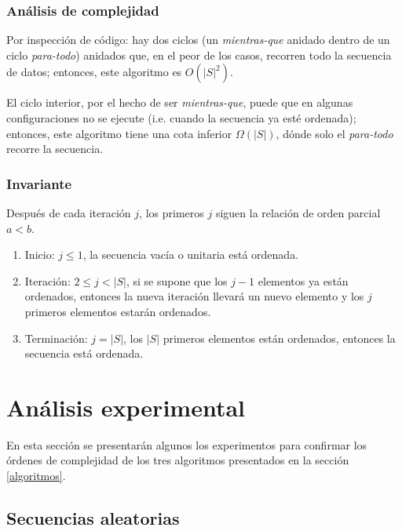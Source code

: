\documentclass[letter]{article}
\begin{document}
\subsubsection{Análisis de complejidad} \label{algoritmos:insercion:complejidad}

Por inspección de código: hay dos ciclos (un {\it mientras-que} anidado dentro de un ciclo {\it para-todo}) anidados que, en el peor de los casos, recorren todo la secuencia de datos; entonces, este algoritmo es $O(|S|^2)$.

El ciclo interior, por el hecho de ser {\it mientras-que}, puede que en algunas configuraciones no se ejecute (i.e. cuando la secuencia ya esté ordenada); entonces, este algoritmo tiene una cota inferior $\Omega(|S|)$, dónde solo el {\it para-todo} recorre la secuencia.

\subsubsection{Invariante} \label{algoritmos:insercion:invariante}

Después de cada iteración $j$, los primeros $j$ siguen la relación de orden parcial $a<b$.

\begin{enumerate}
    \item Inicio: $j \le 1$, la secuencia vacía o unitaria está ordenada.
    \item Iteración: $2 \le j < |S|$, si se supone que los $j-1$ elementos ya están ordenados, entonces la nueva iteración llevará un nuevo elemento y los $j$ primeros elementos estarán ordenados.
    \item Terminación: $j=|S|$, los $|S|$ primeros elementos están ordenados, entonces la secuencia está ordenada.
\end{enumerate}

\section{Análisis experimental} \label{experimentos}

En esta sección se presentarán algunos los experimentos para confirmar los órdenes de complejidad de los tres algoritmos presentados en la sección \ref{algoritmos}.

\subsection{Secuencias aleatorias} \label{experimentos:aleatorias}
\end{document}
